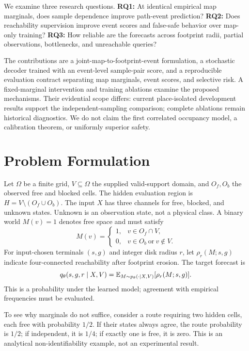 \documentclass[conference,letterpaper,10pt]{IEEEtran}
\begin{document}
We examine three research questions. \textbf{RQ1:} At identical empirical map marginals, does sample dependence improve path-event prediction? \textbf{RQ2:} Does reachability supervision improve event scores and false-safe behavior over map-only training? \textbf{RQ3:} How reliable are the forecasts across footprint radii, partial observations, bottlenecks, and unreachable queries?

The contributions are a joint-map-to-footprint-event formulation, a stochastic decoder trained with an event-level sample-pair score, and a reproducible evaluation contract separating map marginals, event scores, and selective risk. A fixed-marginal intervention and training ablations examine the proposed mechanisms. Their evidential scope differs: current place-isolated development results support the independent-sampling comparison; complete ablations remain historical diagnostics. We do not claim the first correlated occupancy model, a calibration theorem, or uniformly superior safety.

\section{Problem Formulation}
Let $\Omega$ be a finite grid, $V\subseteq\Omega$ the supplied valid-support domain, and $O_f,O_b$ the observed free and blocked cells. The hidden evaluation region is $H=V\setminus(O_f\cup O_b)$. The input $X$ has three channels for free, blocked, and unknown states. Unknown is an observation state, not a physical class. A binary world $M(v)=1$ denotes free space and must satisfy
\begin{equation}
 M(v)=\begin{cases}1,&v\in O_f\cap V,\\0,&v\in O_b\ \text{or}\ v\notin V.\end{cases}
\end{equation}
For input-chosen terminals $(s,g)$ and integer disk radius $r$, let $\rho_r(M;s,g)$ indicate four-connected reachability after footprint erosion. The target forecast is
\begin{equation}
 q_\theta(s,g,r\mid X,V)=\mathbb{E}_{M\sim p_\theta(\cdot\mid X,V)}[\rho_r(M;s,g)].
\end{equation}
This is a probability under the learned model; agreement with empirical frequencies must be evaluated.

To see why marginals do not suffice, consider a route requiring two hidden cells, each free with probability $1/2$. If their states always agree, the route probability is $1/2$; if independent, it is $1/4$; if exactly one is free, it is zero. This is an analytical non-identifiability example, not an experimental result.
\end{document}
